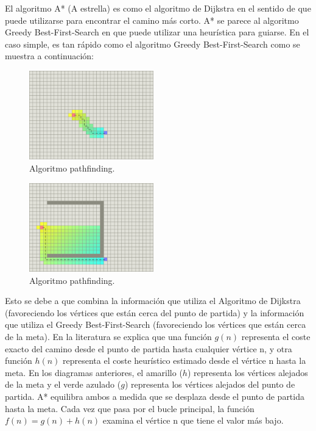 \documentclass[reprint,amsmath,amssymb,aps]{revtex4-2}
\begin{document}
El algoritmo A* (A estrella) es como el algoritmo de Dijkstra en el sentido de que puede utilizarse para encontrar el camino más corto. A* se parece al algoritmo Greedy Best-First-Search en que puede utilizar una heurística para guiarse. En el caso simple, es tan rápido como el algoritmo Greedy Best-First-Search como se muestra a continuación:

\begin{figure}[H]
	\centering
	\includegraphics[width=0.48\textwidth]{a-star.png}
	\caption{Algoritmo pathfinding.}
	\label{a-trap}
\end{figure}

\begin{figure}[H]
	\centering
	\includegraphics[width=0.48\textwidth]{a-star-trap.png}
	\caption{Algoritmo pathfinding.}
	\label{a-trap}
\end{figure}

Esto se debe a que combina la información que utiliza el Algoritmo de Dijkstra (favoreciendo los vértices que están cerca del punto de partida) y la información que utiliza el Greedy Best-First-Search (favoreciendo los vértices que están cerca de la meta). En la literatura se explica que una función $g(n)$ representa el coste exacto del camino desde el punto de partida hasta cualquier vértice n, y otra función $h(n)$ representa el coste heurístico estimado desde el vértice n hasta la meta. En los diagramas anteriores, el amarillo ($h$) representa los vértices alejados de la meta y el verde azulado ($g$) representa los vértices alejados del punto de partida. A* equilibra ambos a medida que se desplaza desde el punto de partida hasta la meta. Cada vez que pasa por el bucle principal, la función $f(n)=g(n)+h(n)$ examina el vértice n que tiene el valor más bajo.
\end{document}
